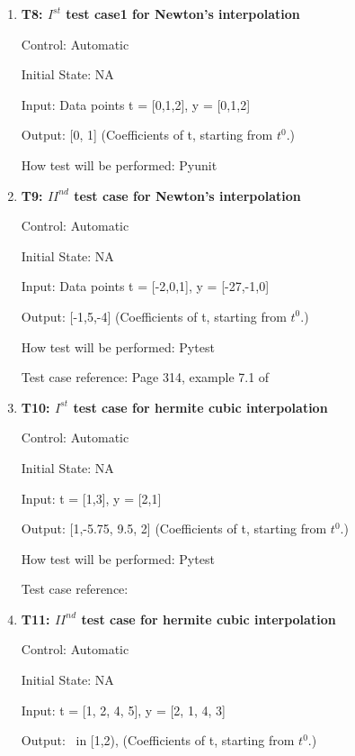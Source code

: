 \documentclass[12pt, titlepage]{article}
\begin{document}
\begin{enumerate}
\item{\textbf{T8: $I^{st}$ test case1 for Newton's interpolation} \\}

Control: Automatic 

Initial State: NA

Input: Data points t = [0,1,2], y = [0,1,2]

Output: [0, 1] (Coefficients of t, starting from $t^{0}$.)

How test will be performed: Pyunit\\


\item{\textbf{T9: ${II}^{nd}$ test case for Newton's interpolation} \\}

Control: Automatic

Initial State: NA

Input: Data points t = [-2,0,1], y = [-27,-1,0]

Output: [-1,5,-4] (Coefficients of t, starting from $t^{0}$.)

How test will be performed: Pytest

Test case reference: Page 314, example 7.1 of \cite{Health1997}\\




\item{\textbf{T10: $I^{st}$ test case for hermite cubic interpolation }\\}

Control: Automatic 

Initial State: NA

Input: t = [1,3], y = [2,1]

Output: [1,-5.75, 9.5, 2] (Coefficients of t, starting from $t^{0}$.)


How test will be performed: Pytest

Test case reference: \cite{HermiteCubic} \\

\item{\textbf{T11: ${II}^{nd}$ test case for hermite cubic interpolation} \\}

Control: Automatic 

Initial State: NA

Input: t = [1, 2, 4, 5], y = [2, 1, 4, 3]

Output: 
~\newline [1.0,1.0, 1.38888889, 2.0] in [1,2), (Coefficients of t, starting from $t^{0}$.)


\end{enumerate}
\end{document}
